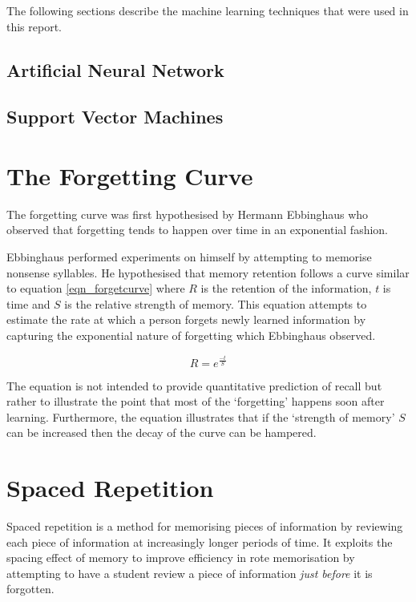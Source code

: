 The following sections describe the machine learning techniques that were used in this report.

\subsection{Artificial Neural Network}

\subsection{Support Vector Machines}
\section{The Forgetting Curve} \label{background_forgettingcurves}
The forgetting curve was first hypothesised by Hermann
Ebbinghaus\cite{ebbinghaus_memory:_1913} who observed that forgetting tends
to happen over time in an exponential fashion.

Ebbinghaus performed experiments on himself by attempting to memorise nonsense
syllables. He hypothesised that memory retention follows a curve similar to
equation \ref{eqn_forgetcurve} where $R$ is the retention of the information,
$t$ is time and $S$ is the relative strength of memory. This equation attempts to
estimate the rate at which a person forgets newly learned information by capturing
the exponential nature of forgetting which Ebbinghaus observed.

\begin{equation}
\label{eqn_forgetcurve}
R = e^{\frac{-t}{S}}
\end{equation}

The equation
is not intended to provide quantitative prediction of recall but rather to illustrate
the point that most of the `forgetting' happens soon after learning. Furthermore,
the equation illustrates that if the `strength of memory' $S$ can
be increased then the decay of the curve can be hampered.



\section{Spaced Repetition} \label{background_spacedrepetition}
Spaced repetition is a method for memorising pieces of information by reviewing
each piece of information at increasingly longer periods of time. It exploits the 
spacing effect of memory to improve efficiency in rote memorisation by attempting to 
have a student review a piece of
information \textit{just before} it is forgotten. 

